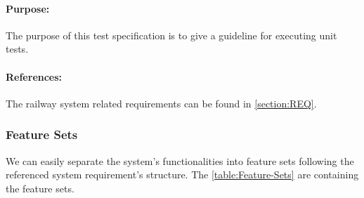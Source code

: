 \paragraph{Purpose:} The purpose of this test specification is to give a guideline for executing unit tests.
\paragraph{References:} The railway system related requirements can be found in \autoref{section:REQ}.

\subsubsection{Feature Sets} We can easily separate the system's functionalities into feature sets following the referenced system requirement's structure. The \autoref{table:Feature-Sets} are containing the feature sets.
